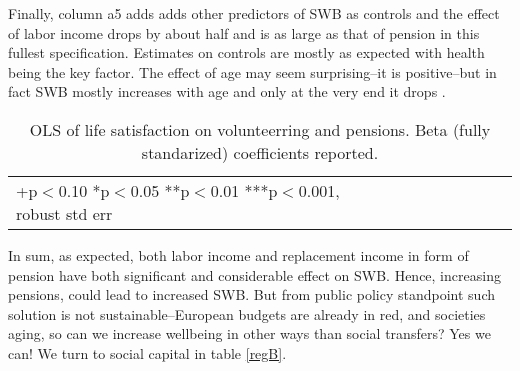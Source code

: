 \documentclass[10pt, letterpaper]{article}
\begin{document}
\begin{spacing}{1.4}
Finally, column a5 adds adds
other predictors of SWB as controls and the effect of labor income drops by
about half
and is as large as that of pension in this fullest specification.
%
Estimates on controls are mostly as expected with health being the key
factor. The effect of age may seem surprising--it is  positive--but in fact SWB mostly
increases with age and only at the very end it drops \citep{gwozdz10}.


\begin{spacing}{.9}
\begin{table}[H]\centering \caption{OLS of life satisfaction on volunteerring
    and pensions. Beta (fully standarized) coefficients reported.}  \begin{scriptsize} \begin{tabular}{p{1.8in}p{.5in}p{.5in}p{.5in}p{.5in}p{.5in}p{.5in}p{.5in}p{.5in}p{.5in}p{.4in}p{.5in}p{.4in}}\hline 
      \hline\multicolumn{5}{l}{+p$<$0.10 *p$<$0.05 **p$<$0.01 ***p$<$0.001,
        robust std err} \end{tabular}\label{regA} \end{scriptsize}\end{table}
\end{spacing}


In sum, as expected, both labor income and replacement income in form of pension
have both significant and considerable effect on SWB. Hence, increasing
pensions, could lead to increased SWB. But from public policy standpoint such
solution is not sustainable--European budgets are already in red,  and societies
aging, so can we increase wellbeing in other ways than social transfers? Yes we
can! We turn to social capital in table \ref{regB}.


\end{spacing}
\end{document}
